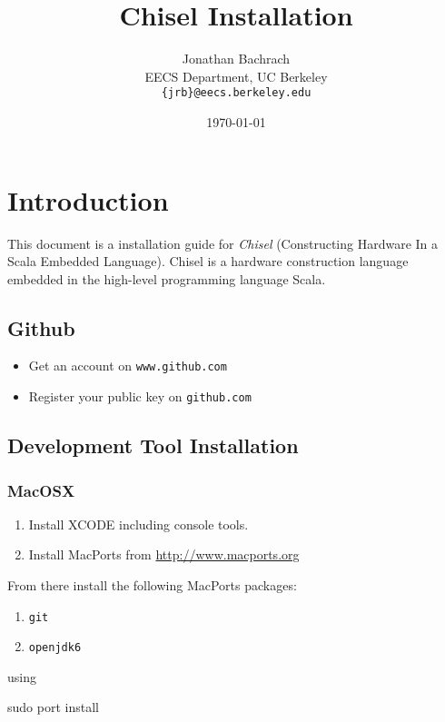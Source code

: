 \documentclass[twocolumn, 10pt]{article}
\title{Chisel Installation}
\author{Jonathan Bachrach \\
EECS Department, UC Berkeley\\
{\tt  \{jrb\}@eecs.berkeley.edu}
}
\date{\today}
\begin{document}
\maketitle{}

\section{Introduction}

This document is a installation guide for {\em Chisel} (Constructing
Hardware In a Scala Embedded Language).  Chisel is a hardware
construction language embedded in the high-level programming language
Scala.  

\subsection{Github}

\begin{itemize}
\item Get an account on \verb|www.github.com|
\item Register your public key on \verb|github.com|
\end{itemize}

\subsection{Development Tool Installation}

\subsubsection{MacOSX}

\begin{enumerate}
\item Install XCODE including console tools.
\item Install MacPorts from \url{http://www.macports.org}
\end{enumerate}

\noindent
From there install the following MacPorts packages:

\begin{enumerate}
\item \verb+git+
\item \verb+openjdk6+
\end{enumerate}

\noindent
using

\begin{bash}
sudo port install
\end{bash}
\end{document}

